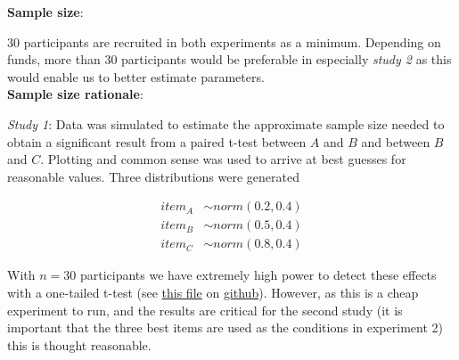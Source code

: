 \documentclass[12pt]{article}
\begin{document}
\textbf{Sample size}:

$30$ participants are recruited in both experiments
as a minimum. Depending on funds, more than $30$
participants would be preferable in especially
\emph{study 2} as this would
enable us to better estimate parameters. \\

\textbf{Sample size rationale}:

\emph{Study 1}: Data was simulated to estimate the
approximate sample size needed to obtain
a significant result from a paired t-test
between $A$ and  $B$ and between $B$ and  $C$.
Plotting and common
sense was used to arrive at best guesses for
reasonable values. Three distributions were generated

\begin{equation} \label{eq3}
\begin{split}
	item_A &\sim norm(0.2, 0.4) \\
	item_B &\sim norm(0.5, 0.4) \\
	item_C &\sim norm(0.8, 0.4)
\end{split}
\end{equation}

With $n = 30$ participants we have extremely
high power to detect these effects with a
one-tailed t-test (see
\href{https://github.com/victor-m-p/BayesianDecisionWeights/blob/main/Code/simulate_study1.Rmd}{this
file} on \href{https://github.com/victor-m-p/BayesianDecisionWeights}{github}). However,
as this is a cheap experiment to run, and the
results are critical for the second study
(it is important that the three best items are
used as the conditions in experiment 2)
this is thought reasonable.

\vspace{3mm}
\end{document}
